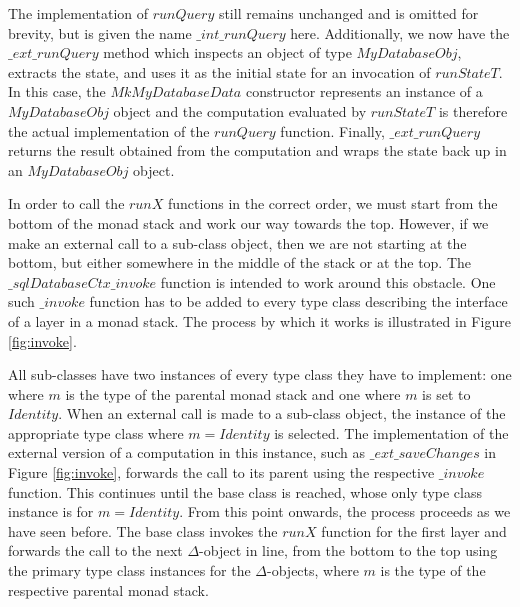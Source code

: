 The implementation of $\mathit{runQuery}$ still remains unchanged and is omitted for brevity, but is given the name $\mathit{\_int\_runQuery}$ here. Additionally, we now have the $\mathit{\_ext\_runQuery}$ method which inspects an object of type $\mathit{MyDatabaseObj}$, extracts the state, and uses it as the initial state for an invocation of $\mathit{runStateT}$. In this case, the $\mathit{MkMyDatabaseData}$ constructor represents an instance of a $\mathit{MyDatabaseObj}$ object and the computation evaluated by $\mathit{runStateT}$ is therefore the actual implementation of the $\mathit{runQuery}$ function. Finally, $\mathit{\_ext\_runQuery}$ returns the result obtained from the computation and wraps the state back up in an $\mathit{MyDatabaseObj}$ object.

In order to call the $\mathit{runX}$ functions in the correct order, we must start from the bottom of the monad stack and work our way towards the top. However, if we make an external call to a sub-class object, then we are not starting at the bottom, but either somewhere in the middle of the stack or at the top. The $\_\mathit{sqlDatabaseCtx\_invoke}$ function is intended to work around this obstacle. One such $\_\mathit{invoke}$ function has to be added to every type class describing the interface of a layer in a monad stack. The process by which it works is illustrated in Figure \ref{fig:invoke}. 

All sub-classes have two instances of every type class they have to implement: one where $m$ is the type of the parental monad stack and one where $m$ is set to $\mathit{Identity}$. When an external call is made to a sub-class object, the instance of the appropriate type class where $m = \mathit{Identity}$ is selected. The implementation of the external version of a computation in this instance, such as $\_\mathit{ext}\_\mathit{saveChanges}$ in Figure \ref{fig:invoke}, forwards the call to its parent using the respective $\_\mathit{invoke}$ function. This continues until the base class is reached, whose only type class instance is for $m = \mathit{Identity}$. From this point onwards, the process proceeds as we have seen before. The base class invokes the $\mathit{runX}$ function for the first layer and forwards the call to the next $\Delta$-object in line, from the bottom to the top using the primary type class instances for the $\Delta$-objects, where $m$ is the type of the respective parental monad stack. 

